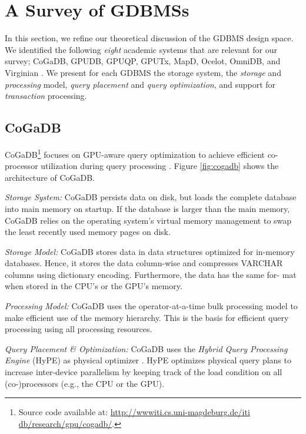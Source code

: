\documentclass[twocolumn]{article}
\begin{document}
\section{A Survey of GDBMSs}
In this section, we refine our theoretical discussion of the GDBMS design space.
We identified the following \textit{eight} academic systems that are relevant for our survey; CoGaDB, GPUDB, GPUQP, GPUTx, MapD, Ocelot, OmniDB, and Virginian \cite{gpgpu:2014}. We present for each GDBMS the storage system, the \textit{storage} and \textit{processing} model, \textit{query placement} and \textit{query optimization}, and support for \textit{transaction} processing.

\subsection{CoGaDB}
CoGaDB\footnote{ Source code available at: \href{http://wwwiti.cs.uni-magdeburg.de/iti db/research/gpu/cogadb/}{http://wwwiti.cs.uni-magdeburg.de/iti db/research/gpu/cogadb/}.} focuses on GPU-aware query optimization to achieve efficient co-processor utilization during query processing \cite{BreB:2013, seb:2013}. Figure \ref{fig:cogadb} shows the architecture of CoGaDB.

\noindent
\textit{Storage System:} 
CoGaDB persists data on disk, but loads the complete database into main memory on startup. If the database is larger than the main memory, CoGaDB relies on the operating system’s virtual memory management to swap the least recently used memory pages on disk.

\noindent
\textit{Storage Model:}
 CoGaDB stores data in data structures optimized for in-memory databases. Hence, it stores the data column-wise and compresses VARCHAR columns using dictionary encoding. Furthermore, the data has the same for- mat when stored in the CPU’s or the GPU’s memory.

\noindent
\textit{Processing Model:} CoGaDB uses the operator-at-a-time bulk processing model to make efficient use of the memory hierarchy. This is the basis for efficient query processing using all processing resources.

\noindent
\textit{Query Placement \& Optimization:} CoGaDB uses the \textit{Hybrid Query Processing Engine} (HyPE) as physical optimizer \cite{BreB:2013, BreB:2014}. HyPE optimizes physical query plans to increase inter-device parallelism by keeping track of the load condition on all (co-)processors (e.g., the CPU or the GPU).
\end{document}
